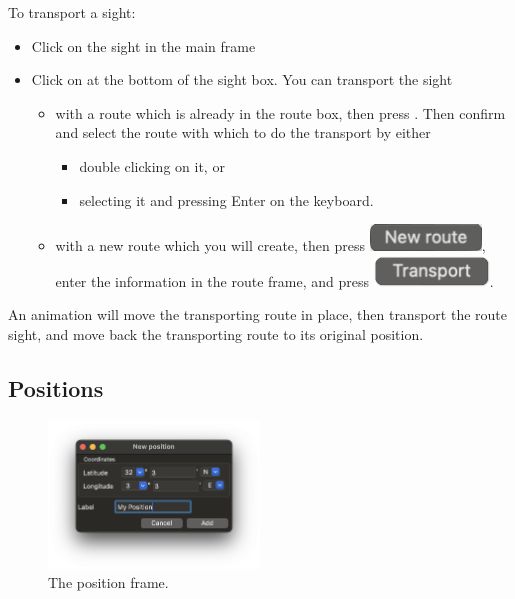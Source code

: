\documentclass{ol-softwaremanual}
\begin{document}
To transport a sight: 
\begin{itemize}
\item Click on the \gls{sight} in the main frame
\item Click on  at the bottom of the \gls{sight} box. You can transport the sight
\begin{itemize}
\item with a route which is already in the route box, then press . Then confirm and select the route with which to do the transport by either
\begin{itemize}
  \item double clicking on it, or
  \item selecting it and pressing Enter on the keyboard. 
\end{itemize}
\item with a new route which you will create, then press \includegraphics{figures/new-route-button.png}, enter the information in the route frame, and press \includegraphics{figures/routeframe-transport-button.png}. 
\end{itemize}
\end{itemize}
An animation will move the transporting route in place, then transport the route sight, and move back the transporting route to its original position. 


\subsection{Positions}\label{section-position}

\begin{figure}
  \includegraphics[width=0.5\textwidth]{figures/position-frame.png}
  \caption{
    \label{fig-position-frame}
    The position frame.  
  }
\end{figure}
\end{document}
